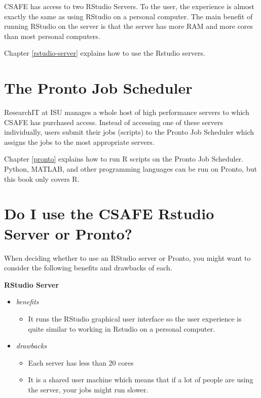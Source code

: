 \documentclass[
]{book}
\providecommand{\tightlist}{%
  \setlength{\itemsep}{0pt}\setlength{\parskip}{0pt}}
\begin{document}
CSAFE has access to two RStudio Servers. To the user, the experience is almost exactly the same as using RStudio on a personal computer. The main benefit of running RStudio on the server is that the server has more RAM and more cores than most personal computers.

Chapter \ref{rstudio-server} explains how to use the Rstudio servers.

\hypertarget{the-pronto-job-scheduler}{%
\section{The Pronto Job Scheduler}\label{the-pronto-job-scheduler}}

ResearchIT at ISU manages a whole host of high performance servers to which CSAFE has purchased access. Instead of accessing one of these servers individually, users submit their jobs (scripts) to the Pronto Job Scheduler which assigns the jobs to the most appropriate servers.

Chapter \ref{pronto} explains how to run R scripts on the Pronto Job Scheduler. Python, MATLAB, and other programming languages can be run on Pronto, but this book only covers R.

\hypertarget{do-i-use-the-csafe-rstudio-server-or-pronto}{%
\section{Do I use the CSAFE Rstudio Server or Pronto?}\label{do-i-use-the-csafe-rstudio-server-or-pronto}}

When deciding whether to use an RStudio server or Pronto, you might want to consider the following benefits and drawbacks of each.

\textbf{RStudio Server}

\begin{itemize}
\tightlist
\item
  \emph{benefits}

  \begin{itemize}
  \tightlist
  \item
    It runs the RStudio graphical user interface so the user experience is quite similar to working in Rstudio on a personal computer.
  \end{itemize}
\item
  \emph{drawbacks}

  \begin{itemize}
  \tightlist
  \item
    Each server has less than 20 cores
  \item
    It is a shared user machine which means that if a lot of people are using the server, your jobs might run slower.
  \end{itemize}
\end{itemize}
\end{document}
